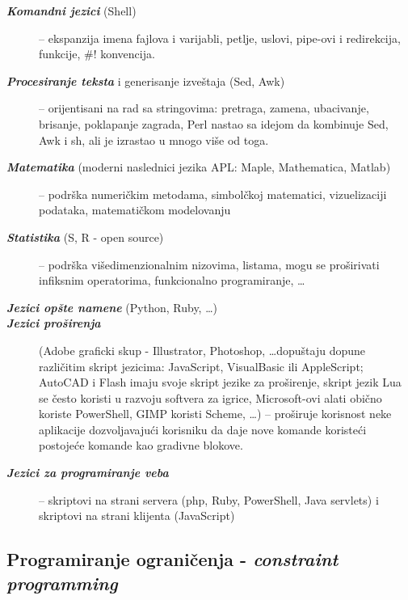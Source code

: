 \documentclass[../main.tex]{subfiles}
\begin{document}
\begin{description}

	\item[{\it \bf Komandni jezici} (Shell)] -- ekspanzija imena fajlova i varijabli, petlje, uslovi, pipe-ovi i redirekcija, funkcije, \#! konvencija.

	\item[{\it \bf Procesiranje teksta} i generisanje izveštaja (Sed, Awk)] -- orijentisani na rad sa stringovima: pretraga, zamena, ubacivanje, brisanje, poklapanje zagrada, Perl nastao sa idejom da kombinuje Sed, Awk i sh, ali je izrastao u mnogo više od toga.

	\item[{\it \bf Matematika} (moderni naslednici jezika APL: Maple, Mathematica, Matlab)] -- podrška numeričkim metodama, simbolčkoj matematici, vizuelizaciji podataka, matematičkom modelovanju

	\item[{\it \bf Statistika} (S, R - open source)] -- podrška višedimenzionalnim nizovima, listama, mogu se proširivati infiksnim operatorima, funkcionalno programiranje, \ldots

	\item[{\it \bf Jezici opšte namene} (Python, Ruby, \ldots)]

	\item[{\it \bf Jezici proširenja}] (Adobe graficki skup - Illustrator, Photoshop, \ldots dopuštaju dopune različitim skript jezicima: JavaScript, VisualBasic ili AppleScript; AutoCAD i Flash imaju svoje skript jezike za proširenje, skript jezik Lua se često koristi u razvoju softvera za igrice, Microsoft-ovi alati obično koriste PowerShell, GIMP koristi Scheme, \ldots) -- proširuje korisnost neke aplikacije dozvoljavajući korisniku da daje nove komande koristeći postojeće komande kao gradivne blokove.

	\item[{\it \bf Jezici za programiranje veba}] -- skriptovi na strani servera (php, Ruby, PowerShell, Java servlets) i skriptovi na strani klijenta (JavaScript)

\end{description}


\begin{boxnaslovi}
\section{Programiranje ograničenja - {\it constraint programming}}						%
\end{boxnaslovi}
\end{document}
